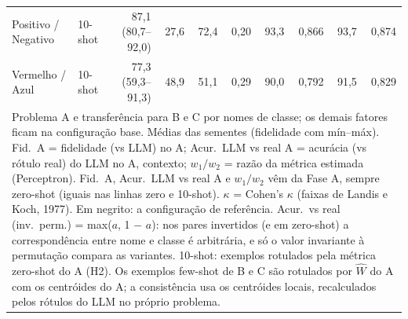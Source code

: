 \begin{table}[htbp]
\begin{tabular}{llrrrrrrrr}
Positivo / Negativo & 10-shot & 87,1 (80,7–92,0) & 27,6 & 72,4 & 0,20 & 93,3 & 0,866 & 93,7 & 0,874 \\
Vermelho / Azul & 10-shot & 77,3 (59,3–91,3) & 48,9 & 51,1 & 0,29 & 90,0 & 0,792 & 91,5 & 0,829 \\
\bottomrule
\multicolumn{10}{p{0.95\linewidth}}{\footnotesize Problema A e transferência para B e C por nomes de classe; os demais fatores ficam na configuração base. Médias das sementes (fidelidade com mín–máx). Fid.\ A = fidelidade (vs LLM) no A; Acur.\ LLM vs real A = acurácia (vs rótulo real) do LLM no A, contexto; $w_1/w_2$ = razão da métrica estimada (Perceptron). Fid.\ A, Acur.\ LLM vs real A e $w_1/w_2$ vêm da Fase A, sempre zero-shot (iguais nas linhas zero e 10-shot). $\kappa$ = Cohen's $\kappa$ (faixas de Landis e Koch, 1977). Em negrito: a configuração de referência. Acur.\ vs real (inv.\ perm.) = max($a$, 1 $-$ $a$): nos pares invertidos (e em zero-shot) a correspondência entre nome e classe é arbitrária, e só o valor invariante à permutação compara as variantes. 10-shot: exemplos rotulados pela métrica zero-shot do A (H2). Os exemplos few-shot de B e C são rotulados por $\hat{W}$ do A com os centróides do A; a consistência usa os centróides locais, recalculados pelos rótulos do LLM no próprio problema.} \\
\end{tabular}
\end{table}
